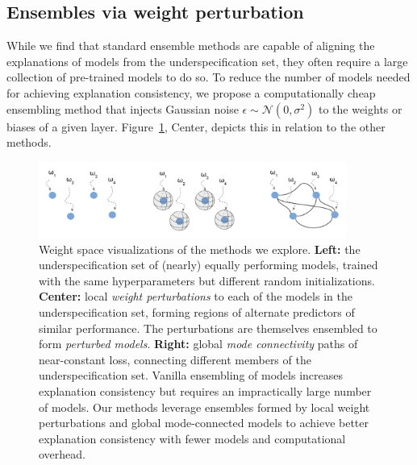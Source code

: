 \subsection{Ensembles via weight perturbation}
\label{subsec:ensembles_weight}

While we find that standard ensemble methods are capable of aligning the explanations of models from the underspecification set, they often require a large collection of pre-trained models to do so. To reduce the number of models needed for achieving explanation consistency, we propose a computationally cheap ensembling method that injects Gaussian noise $\epsilon \sim \mathcal{N}(0,\sigma^2)$ to the weights or biases of a given layer. Figure~\ref{fig:weight_space}, Center, depicts this in relation to the other methods.

\begin{figure}[t]
    \centering
    \includegraphics[width=0.9\textwidth]{figures/weight_space.png}
    \caption{\small Weight space visualizations of the methods we explore. \textbf{Left:} the underspecification set of (nearly) equally performing models, trained with the same hyperparameters but different random initializations. \textbf{Center:} local \textit{weight perturbations} to each of the models in the underspecification set, forming regions of alternate predictors of similar performance. The perturbations are themselves ensembled to form \textit{perturbed models}. \textbf{Right:} global \textit{mode connectivity} paths of near-constant loss, connecting different members of the underspecification set. Vanilla ensembling of models increases explanation consistency but requires an impractically large number of models. Our methods leverage ensembles formed by local weight perturbations and global mode-connected models to achieve better explanation consistency with fewer models and computational overhead.}
    \label{fig:weight_space}
\end{figure}

